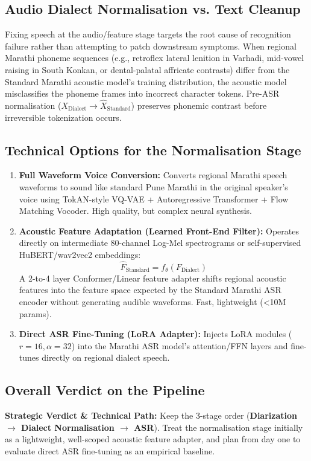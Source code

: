 \documentclass[11pt]{article}
\begin{document}
\subsection{Audio Dialect Normalisation vs. Text Cleanup}
Fixing speech at the audio/feature stage targets the root cause of recognition failure rather than attempting to patch downstream symptoms. When regional Marathi phoneme sequences (e.g., retroflex lateral lenition in Varhadi, mid-vowel raising in South Konkan, or dental-palatal affricate contrasts) differ from the Standard Marathi acoustic model's training distribution, the acoustic model misclassifies the phoneme frames into incorrect character tokens. Pre-ASR normalisation ($X_{\text{Dialect}} \to \hat{X}_{\text{Standard}}$) preserves phonemic contrast before irreversible tokenization occurs.

\subsection{Technical Options for the Normalisation Stage}
\begin{enumerate}[leftmargin=*]
  \item \textbf{Full Waveform Voice Conversion:} Converts regional Marathi speech waveforms to sound like standard Pune Marathi in the original speaker's voice using TokAN-style VQ-VAE + Autoregressive Transformer + Flow Matching Vocoder. High quality, but complex neural synthesis.
  \item \textbf{Acoustic Feature Adaptation (Learned Front-End Filter):} Operates directly on intermediate 80-channel Log-Mel spectrograms or self-supervised HuBERT/wav2vec2 embeddings:
    \[
    \hat{F}_{\text{Standard}} = f_\theta(F_{\text{Dialect}})
    \]
    A 2-to-4 layer Conformer/Linear feature adapter shifts regional acoustic features into the feature space expected by the Standard Marathi ASR encoder without generating audible waveforms. Fast, lightweight (<10M params).
  \item \textbf{Direct ASR Fine-Tuning (LoRA Adapter):} Injects LoRA modules ($r=16, \alpha=32$) into the Marathi ASR model's attention/FFN layers and fine-tunes directly on regional dialect speech.
\end{enumerate}

\subsection{Overall Verdict on the Pipeline}
\begin{infobox}
\textbf{Strategic Verdict \& Technical Path:}
Keep the 3-stage order (\textbf{Diarization $\rightarrow$ Dialect Normalisation $\rightarrow$ ASR}). Treat the normalisation stage initially as a lightweight, well-scoped acoustic feature adapter, and plan from day one to evaluate direct ASR fine-tuning as an empirical baseline.
\end{infobox}
\end{document}
